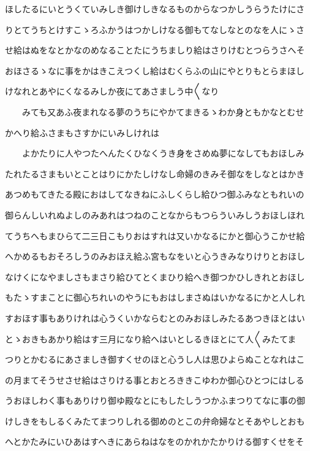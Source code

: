 \documentclass[a4paper,11pt,landscape]{ltjtarticle}
\begin{document}
ほしたるにいとうくていみしき御けしきなるものからなつかしうらうたけにさ
\par\medskip
りとてうちとけすこゝろふかうはつかしけなる御もてなしなとのなを人にゝさ
\par\medskip
せ給はぬをなとかなのめなることたにうちましり給はさりけむとつらうさへそ
\par\medskip
おほさるゝなに事をかはきこえつくし給はむくらふの山にやとりもとらまほし
\par\medskip
けなれとあやにくなるみしか夜にてあさましう中〱なり
\par\medskip
　　みても又あふ夜まれなる夢のうちにやかてまきるゝわか身ともかなとむせ
\par\medskip
かへり給ふさまもさすかにいみしけれは
\par\medskip
　　よかたりに人やつたへんたくひなくうき身をさめぬ夢になしてもおほしみ
\par\medskip
たれたるさまもいとことはりにかたしけなし命婦のきみそ御なをしなとはかき
\par\medskip
あつめもてきたる殿におはしてなきねにふしくらし給ひつ御ふみなともれいの
\par\medskip
御らんしいれぬよしのみあれはつねのことなからもつらういみしうおほしほれ
\par\medskip
てうちへもまひらて二三日こもりおはすれは又いかなるにかと御心うこかせ給
\par\medskip
へかめるもおそろしうのみおほえ給ふ宮もなをいと心うきみなりけりとおほし
\par\medskip
なけくになやましさもまさり給ひてとくまひり給へき御つかひしきれとおほし
\par\medskip
もたゝすまことに御心ちれいのやうにもおはしまさぬはいかなるにかと人しれ
\par\medskip
すおほす事もありけれは心うくいかならむとのみおほしみたるあつきほとはい
\par\medskip
とゝおきもあかり給はす三月になり給へはいとしるきほとにて人〱みたてま
\par\medskip
つりとかむるにあさましき御すくせのほと心うし人は思ひよらぬことなれはこ
\par\medskip
の月まてそうせさせ給はさりける事とおとろききこゆわか御心ひとつにはしる
\par\medskip
うおほしわく事もありけり御ゆ殿なとにもしたしうつかふまつりてなに事の御
\par\medskip
けしきをもしるくみたてまつりしれる御めのとこの弁命婦なとそあやしとおも
\par\medskip
へとかたみにいひあはすへきにあらねはなをのかれかたかりける御すくせをそ
\end{document}
